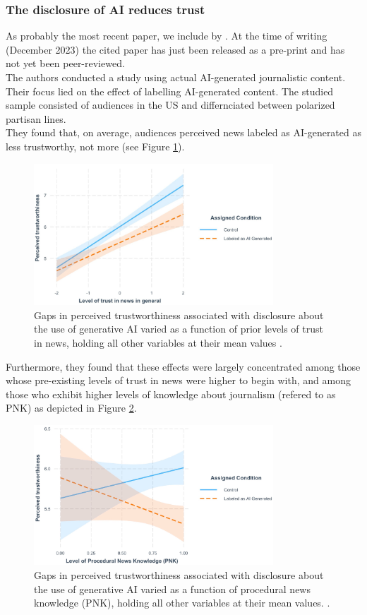 \documentclass[
  a4paper,  %
  twoside,  %
  bibliography=totoc,
  headsepline,
  cleardoublepage=empty,
  parskip=half,
  draft=false
]{scrbook}
\begin{document}
\subsubsection*{The disclosure of AI reduces trust}
As probably the most recent paper, we include  by \citeauthor{toffTheyCouldJust2023}. At the time of writing (December 2023) the cited paper has just been released as a pre-print and has not yet been peer-reviewed. \\
The authors conducted a study using actual AI-generated journalistic content. Their focus lied on the effect of labelling AI-generated content. The studied sample consisted of audiences in the US and differnciated between polarized partisan lines. \\
They found that, on average, audiences perceived news labeled as AI-generated as less trustworthy, not more (see Figure \ref{fig:toff-trust}). 
\begin{figure}[h]
  \centering
  \includegraphics[width=0.8\textwidth]{./graphics/toff/Trust in news.png}
  \caption{Gaps in perceived trustworthiness associated with disclosure about the use of generative AI varied as a function of prior levels of trust in news, holding all other variables at their mean values \cite{toffTheyCouldJust2023}.}
  \label{fig:toff-trust}
\end{figure}
Furthermore, they found that these effects were largely concentrated among those whose pre-existing levels of trust in news were higher to begin with, and among those who exhibit higher levels of knowledge about journalism (refered to as PNK) as depicted in Figure \ref{fig:toff-PNK}.
\begin{figure}[h]
  \centering
  \includegraphics[width=0.8\textwidth]{./graphics/toff/PNK.png}
  \caption{Gaps in perceived trustworthiness associated with disclosure about the use of generative AI varied as a function of procedural news knowledge (PNK), holding all other variables at their mean values. \cite{toffTheyCouldJust2023}.}
  \label{fig:toff-PNK}
\end{figure}
\end{document}
